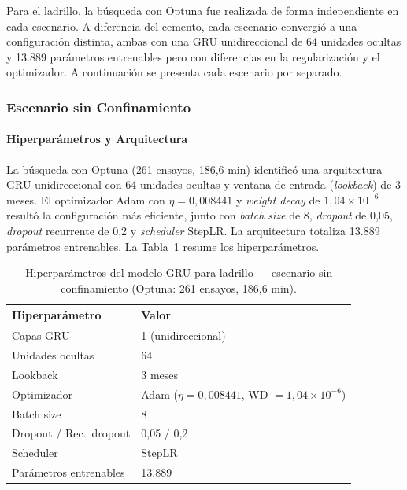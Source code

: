 \justify
Para el ladrillo, la búsqueda con Optuna fue realizada de forma independiente en cada escenario. A diferencia del cemento, cada escenario convergió a una configuración distinta, ambas con una GRU unidireccional de 64 unidades ocultas y 13.889 parámetros entrenables pero con diferencias en la regularización y el optimizador. A continuación se presenta cada escenario por separado.


\subsubsection{Escenario sin Confinamiento}

\paragraph{Hiperparámetros y Arquitectura}

\justify
La búsqueda con Optuna (261 ensayos, 186,6 min) identificó una arquitectura GRU unidireccional con 64 unidades ocultas y ventana de entrada (\textit{lookback}) de 3 meses. El optimizador Adam con $\eta = 0{,}008441$ y \textit{weight decay} de $1{,}04 \times 10^{-6}$ resultó la configuración más eficiente, junto con \textit{batch size} de 8, \textit{dropout} de 0{,}05, \textit{dropout} recurrente de 0{,}2 y \textit{scheduler} StepLR. La arquitectura totaliza 13.889 parámetros entrenables. La Tabla~\ref{tab:gru_ladrillo_sc_arq} resume los hiperparámetros.

\begin{table}[H]
    \centering
    \caption{Hiperparámetros del modelo GRU para ladrillo --- escenario sin confinamiento (Optuna: 261 ensayos, 186{,}6 min).}
    \label{tab:gru_ladrillo_sc_arq}
    \begin{tabular}{ll}
        \toprule
        \textbf{Hiperparámetro} & \textbf{Valor} \\
        \midrule
        Capas GRU              & 1 (unidireccional) \\
        Unidades ocultas       & 64 \\
        Lookback               & 3 meses \\
        Optimizador            & Adam ($\eta=0{,}008441$, WD $=1{,}04 \times 10^{-6}$) \\
        Batch size             & 8 \\
        Dropout / Rec.\ dropout & 0{,}05 / 0{,}2 \\
        Scheduler              & StepLR \\
        Parámetros entrenables & 13.889 \\
        \bottomrule
    \end{tabular}
\end{table}


